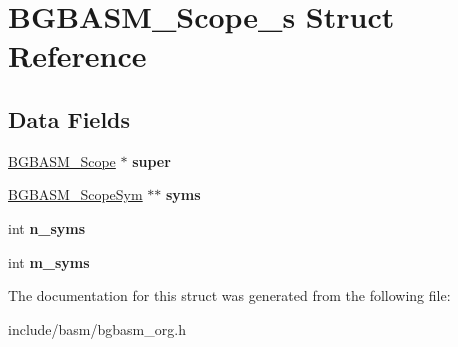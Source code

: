\hypertarget{structBGBASM__Scope__s}{\section{B\-G\-B\-A\-S\-M\-\_\-\-Scope\-\_\-s Struct Reference}
\label{structBGBASM__Scope__s}
}
\subsection*{Data Fields}
\begin{DoxyCompactItemize}
\item 
\hypertarget{structBGBASM__Scope__s_aee00a8b197c0a01fd363ed97c35b0450}{\hyperlink{structBGBASM__Scope__s}{B\-G\-B\-A\-S\-M\-\_\-\-Scope} $\ast$ {\bfseries super}}\label{structBGBASM__Scope__s_aee00a8b197c0a01fd363ed97c35b0450}

\item 
\hypertarget{structBGBASM__Scope__s_a6941a447e89ab89f25fe30c0d7c6f798}{\hyperlink{structBGBASM__ScopeSym__s}{B\-G\-B\-A\-S\-M\-\_\-\-Scope\-Sym} $\ast$$\ast$ {\bfseries syms}}\label{structBGBASM__Scope__s_a6941a447e89ab89f25fe30c0d7c6f798}

\item 
\hypertarget{structBGBASM__Scope__s_ae4195a0ccb4dfff6f546da5c1c951bd5}{int {\bfseries n\-\_\-syms}}\label{structBGBASM__Scope__s_ae4195a0ccb4dfff6f546da5c1c951bd5}

\item 
\hypertarget{structBGBASM__Scope__s_ac21f90505fa81b9e22cdbcc59dab6b89}{int {\bfseries m\-\_\-syms}}\label{structBGBASM__Scope__s_ac21f90505fa81b9e22cdbcc59dab6b89}

\end{DoxyCompactItemize}


The documentation for this struct was generated from the following file\-:\begin{DoxyCompactItemize}
\item 
include/basm/bgbasm\-\_\-org.\-h\end{DoxyCompactItemize}
